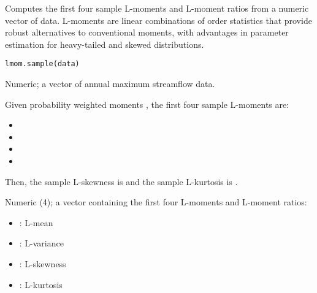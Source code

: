 \documentclass[a4paper]{book}
\begin{document}
%
\begin{Description}
Computes the first four sample L-moments and L-moment ratios from a numeric
vector of data. L-moments are linear combinations of order statistics that
provide robust alternatives to conventional moments, with advantages in
parameter estimation for heavy-tailed and skewed distributions.
\end{Description}
%
\begin{Usage}
\begin{verbatim}
lmom.sample(data)
\end{verbatim}
\end{Usage}
%
\begin{Arguments}
\begin{ldescription}
\item[\code{data}] Numeric; a vector of annual maximum streamflow data.
\end{ldescription}
\end{Arguments}
%
\begin{Details}
Given probability weighted moments , the
first four sample L-moments are:
\begin{itemize}

\item{} 
\item{} 
\item{} 
\item{} 

\end{itemize}


Then, the sample L-skewness is  and the sample L-kurtosis
is .
\end{Details}
%
\begin{Value}
Numeric (4); a vector containing the first four L-moments and L-moment ratios:
\begin{itemize}

\item{} : L-mean
\item{} : L-variance
\item{} : L-skewness
\item{} : L-kurtosis

\end{itemize}

\end{Value}
\end{document}
